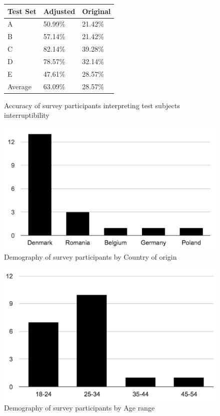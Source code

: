 \documentclass{sigchi}
\begin{document}
\begin{figure}[h]
  \centering
  \begin{tabular}{@{}lll@{}}
    \toprule
    Test Set     & Adjusted & Original \\ \midrule
    A       & 50.99\%    & 21.42\%    \\
    B       & 57.14\%    & 21.42\%    \\
    C       & 82.14\%    & 39.28\%    \\
    D       & 78.57\%    & 32.14\%    \\
    E       & 47.61\%    & 28.57\%    \\ \midrule
    Average & 63.09\%    & 28.57\%    \\ \bottomrule
  \end{tabular}
  \caption{Accuracy of survey participants interpreting test subjects interruptibility}
  \label{tab:survey_accuracy}
\end{figure}

\begin{figure}[h]
  \centering
  \includegraphics[width=\columnwidth]{figures/demography_country.png}
  \caption{Demography of survey participants by Country of origin}
  \label{fig:demography_country}
\end{figure}

\begin{figure}[h]
  \centering
  \includegraphics[width=\columnwidth]{figures/demography_age.png}
  \caption{Demography of survey participants by Age range}
  \label{fig:demography_age}
\end{figure}
\end{document}
